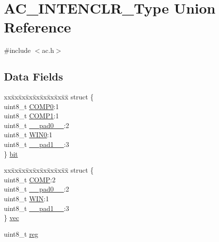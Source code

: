 \hypertarget{union_a_c___i_n_t_e_n_c_l_r___type}{}\section{A\+C\+\_\+\+I\+N\+T\+E\+N\+C\+L\+R\+\_\+\+Type Union Reference}
\label{union_a_c___i_n_t_e_n_c_l_r___type}


{\ttfamily \#include $<$ac.\+h$>$}

\subsection*{Data Fields}
\begin{DoxyCompactItemize}
\item 
\begin{tabbing}
xx\=xx\=xx\=xx\=xx\=xx\=xx\=xx\=xx\=\kill
struct \{\\
\>uint8\_t \mbox{\hyperlink{union_a_c___i_n_t_e_n_c_l_r___type_aa1a89fecc6523791fd811ee28d767ef8}{COMP0}}:1\\
\>uint8\_t \mbox{\hyperlink{union_a_c___i_n_t_e_n_c_l_r___type_a4d52eb0bdd0934cfcd0ccd7ec64ae30d}{COMP1}}:1\\
\>uint8\_t \mbox{\hyperlink{union_a_c___i_n_t_e_n_c_l_r___type_a8b4eebe79ded0459acec2f4950102ba3}{\_\_pad0\_\_}}:2\\
\>uint8\_t \mbox{\hyperlink{union_a_c___i_n_t_e_n_c_l_r___type_ab1654ffd18d4bea08938666385d877ef}{WIN0}}:1\\
\>uint8\_t \mbox{\hyperlink{union_a_c___i_n_t_e_n_c_l_r___type_a77f12d2e278bd5c07712648ac0df5e08}{\_\_pad1\_\_}}:3\\
\} \mbox{\hyperlink{union_a_c___i_n_t_e_n_c_l_r___type_a59c7a473e7181c1f6d317185b0828157}{bit}}\\

\end{tabbing}\item 
\begin{tabbing}
xx\=xx\=xx\=xx\=xx\=xx\=xx\=xx\=xx\=\kill
struct \{\\
\>uint8\_t \mbox{\hyperlink{union_a_c___i_n_t_e_n_c_l_r___type_a31aebd898f59a247ec09db59b349132a}{COMP}}:2\\
\>uint8\_t \mbox{\hyperlink{union_a_c___i_n_t_e_n_c_l_r___type_a8b4eebe79ded0459acec2f4950102ba3}{\_\_pad0\_\_}}:2\\
\>uint8\_t \mbox{\hyperlink{union_a_c___i_n_t_e_n_c_l_r___type_ab094d122e5713969d382227bdeab2946}{WIN}}:1\\
\>uint8\_t \mbox{\hyperlink{union_a_c___i_n_t_e_n_c_l_r___type_a77f12d2e278bd5c07712648ac0df5e08}{\_\_pad1\_\_}}:3\\
\} \mbox{\hyperlink{union_a_c___i_n_t_e_n_c_l_r___type_a83acbbdb6ee1e0758b9ac896b1b0990a}{vec}}\\

\end{tabbing}\item 
uint8\+\_\+t \mbox{\hyperlink{union_a_c___i_n_t_e_n_c_l_r___type_a9428adc9af4653a2050e2536b55dec8d}{reg}}
\end{DoxyCompactItemize}


